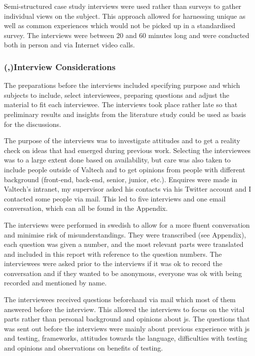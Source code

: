 \documentclass[11pt]{article}
\begin{document}
Semi-structured case study interviews were used rather than surveys to gather individual views on the subject. This approach allowed for harnessing unique as well as common experiences which would not be picked up in a standardised survey. The interviews were between 20 and 60 minutes long and were conducted both in person and via Internet video calls.

\subsubsection{(,)Interview Considerations}

The preparations before the interviews included specifying purpose and which subjects to include, select interviewees, preparing questions and adjust the material to fit each interviewee. The interviews took place rather late so that preliminary results and insights from the literature study could be used as basis for the discussions.

The purpose of the interviews was to investigate attitudes and to get a reality check on ideas that had emerged during previous work. Selecting the interviewees was to a large extent done based on availability, but care was also taken to include people outside of Valtech and to get opinions from people with different background (front-end, back-end, senior, junior, etc.). Enquires were made in Valtech's intranet, my supervisor asked his contacts via his Twitter account and I contacted some people via mail. This led to five interviews and one email conversation, which can all be found in the Appendix.

The interviews were performed in swedish to allow for a more fluent conversation and minimise risk of misunderstandings. They were transcribed (see Appendix), each question was given a number, and the most relevant parts were translated and included in this report with reference to the question numbers. The interviewees were asked prior to the interviews if it was ok to record the conversation and if they wanted to be anonymous, everyone was ok with being recorded and mentioned by name.

The interviewees received questions beforehand via mail which most of them answered before the interview. This allowed the interviews to focus on the vital parts rather than personal background and opinions about \gls{js}. The questions that was sent out before the interviews were mainly about previous experience with \gls{js} and testing, frameworks, attitudes towards the language, difficulties with testing and opinions and observations on benefits of testing.
\end{document}
